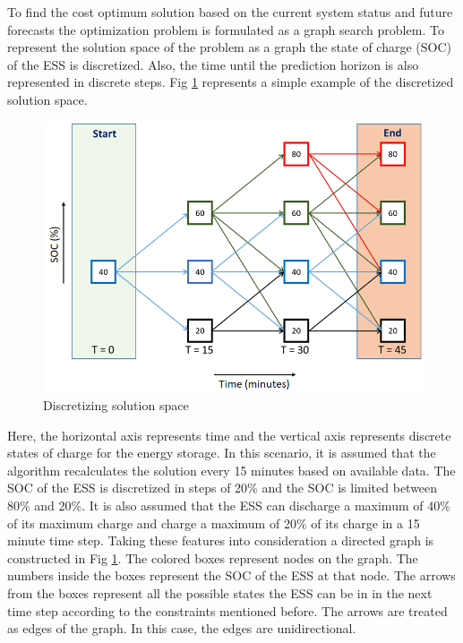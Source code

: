 To find the cost optimum solution based on the current system status and future forecasts the optimization problem is formulated as a graph search problem. To represent the solution space of the problem as a graph the state of charge (SOC) of the ESS is discretized. Also, the time until the prediction horizon is also represented in discrete steps. Fig \ref{fig:F1_Dis} represents a simple example of the discretized solution space.

\begin{figure}[!ht]
    \centering
    \includegraphics[width = \linewidth]{figs/F1_1_Dis.png}
    \caption{Discretizing solution space}
    \label{fig:F1_Dis}
\end{figure}
Here, the horizontal axis represents time and the vertical axis represents discrete states of charge for the energy storage. In this scenario, it is assumed that the algorithm recalculates the solution every 15 minutes based on available data. The SOC of the ESS is discretized in steps of 20\% and the SOC is limited between 80\% and 20\%. It is also assumed that the ESS can discharge a maximum of 40\% of its maximum charge and charge a maximum of 20\% of its charge in a 15 minute time step. Taking these features into consideration a directed graph is constructed in Fig \ref{fig:F1_Dis}. The colored boxes represent nodes on the graph. The numbers inside the boxes represent the SOC of the ESS at that node. The arrows from the boxes represent all the possible states the ESS can be in in the next time step according to the constraints mentioned before. The arrows are treated as edges of the graph. In this case, the edges are unidirectional.

